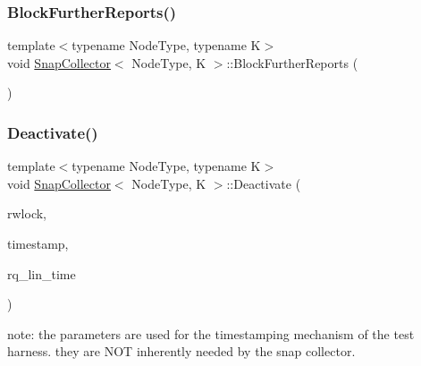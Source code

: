 \mbox{\label{classSnapCollector_a0848f9cf2e792a241809d9ff23a24bab}} 
\subsubsection{\texorpdfstring{Block\+Further\+Reports()}{BlockFurtherReports()}}
{\footnotesize\ttfamily template$<$typename Node\+Type, typename K$>$ \\
void \hyperlink{classSnapCollector}{Snap\+Collector}$<$ Node\+Type, K $>$\+::Block\+Further\+Reports (\begin{DoxyParamCaption}{ }\end{DoxyParamCaption})\hspace{0.3cm}{\ttfamily [inline]}}

\mbox{\label{classSnapCollector_a56d824c8e580ccb9422edcef9a26e636}} 
\subsubsection{\texorpdfstring{Deactivate()}{Deactivate()}}
{\footnotesize\ttfamily template$<$typename Node\+Type, typename K$>$ \\
void \hyperlink{classSnapCollector}{Snap\+Collector}$<$ Node\+Type, K $>$\+::Deactivate (\begin{DoxyParamCaption}\item[{pthread\+\_\+rwlock\+\_\+t $\ast$const}]{rwlock,  }\item[{volatile long long $\ast$}]{timestamp,  }\item[{long long $\ast$}]{rq\+\_\+lin\+\_\+time }\end{DoxyParamCaption})\hspace{0.3cm}{\ttfamily [inline]}}

note\+: the parameters are used for the timestamping mechanism of the test harness. they are N\+OT inherently needed by the snap collector. \mbox{\label{classSnapCollector_afbc67dba82450f2d89099b0614c83804}} 
